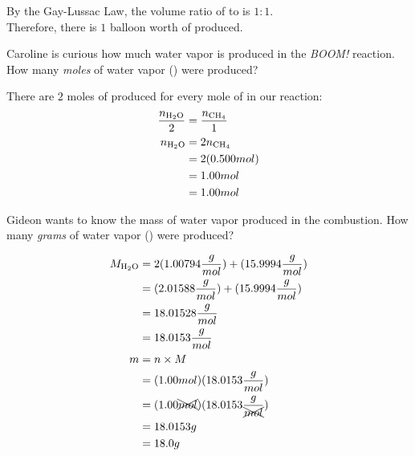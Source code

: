 \documentclass[11pt,addpoints]{exam}   	%
\begin{document}
\begin{questions}
\begin{solution}
By the Gay-Lussac Law, the volume ratio of  to  is $1:1$.\\
Therefore, there is $1$ balloon worth of  produced.
\end{solution}


\question[5] Caroline is curious how much water vapor is produced in the \emph{BOOM!} reaction. How many \emph{moles} of water vapor () were produced?
\begin{solution}
There are $2$ moles of  produced for every mole of  in our reaction: \\

\begin{equation} 
\begin{split}
    \frac{n_{\ce{H2O}}}{2} &= \frac{n_{\ce{CH4}}}{1} \\
    n_{\ce{H2O}} &= 2 n_{\ce{CH4}} \\
                       &= 2 (0.500 mol ) \\
                       &= 1.00 mol \\
                       &= 1.00 mol
 \end{split}
 \end{equation}
\end{solution}



\question[5] Gideon wants to know the mass of water vapor produced in the combustion. How many \emph{grams} of water vapor () were produced?\\

\begin{solution}
\begin{equation} 
\begin{split}
    M_{\ce{H2O}} &= 2 (1.00794 \frac{g}{mol}) + (15.9994 \frac{g}{mol}) \\
                           &= (2.01588 \frac{g}{mol}) + (15.9994 \frac{g}{mol}) \\
                           &= 18.01528 \frac{g}{mol} \\      
                           &= 18.0153 \frac{g}{mol} \\              
    m &= n \times M \\
        &= (1.00 mol ) (18.0153 \frac{g}{mol}) \\
        &= (1.00 \xcancel{mol} ) (18.0153 \frac{g}{\xcancel{mol}}) \\
        &= 18.0153 g \\
        &= 18.0 g
 \end{split}
 \end{equation}
 \end{solution}



\end{questions}
\end{document}
